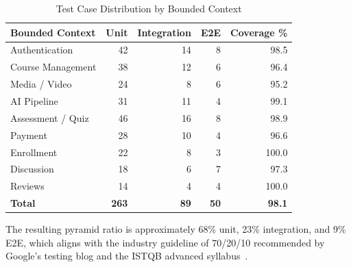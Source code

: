 \begin{table}[H]
  \centering
  \caption{Test Case Distribution by Bounded Context}\label{tab:pyramid-distribution}
  \small
  \begin{tabular}{lrrrr}
    \toprule
    \textbf{Bounded Context} & \textbf{Unit} & \textbf{Integration} & \textbf{E2E} & \textbf{Coverage \%} \\
    \midrule
    \rowcolor{green!10}
    Authentication           & 42            & 14                   & 8  & 98.5 \\
    \rowcolor{green!10}
    Course Management        & 38            & 12                   & 6  & 96.4 \\
    \rowcolor{green!10}
    Media / Video            & 24            & 8                    & 6  & 95.2 \\
    \rowcolor{green!10}
    AI Pipeline              & 31            & 11                   & 4  & 99.1 \\
    \rowcolor{green!10}
    Assessment / Quiz        & 46            & 16                   & 8  & 98.9 \\
    \rowcolor{green!10}
    Payment                  & 28            & 10                   & 4  & 96.6 \\
    \rowcolor{green!10}
    Enrollment               & 22            & 8                    & 3  & 100.0 \\
    \rowcolor{green!10}
    Discussion               & 18            & 6                    & 7  & 97.3 \\
    \rowcolor{green!10}
    Reviews                  & 14            & 4                    & 4  & 100.0 \\
    \midrule
    \textbf{Total}           & \textbf{263} & \textbf{89}          & \textbf{50} & \textbf{98.1} \\
    \bottomrule
  \end{tabular}
\end{table}

The resulting pyramid ratio is approximately 68\% unit, 23\% integration, and 9\% E2E, which aligns with the industry guideline of 70/20/10 recommended by Google's testing blog and the ISTQB advanced syllabus~\cite{istqb2024}.
